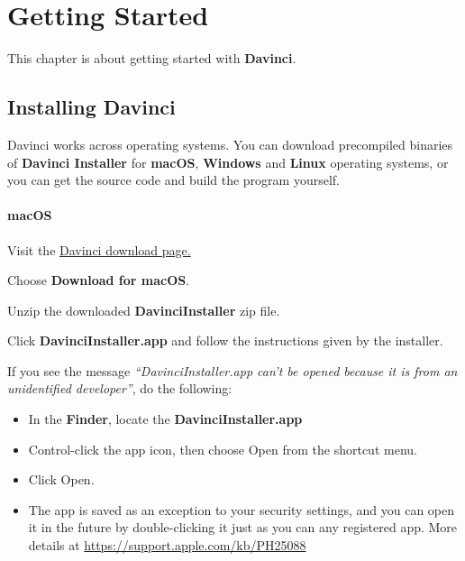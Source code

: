 

\chapter{Getting Started}

This chapter is about getting started with \textbf{Davinci}.

\section{Installing Davinci}

Davinci works across operating systems. You can download precompiled binaries of \textbf{Davinci Installer} for \textbf{macOS}, \textbf{Windows} and \textbf{Linux} operating systems, or you can get the source code and build the program yourself.

\subsubsection{macOS}

\begin{boxitemize}
	\item Visit the \href{http://davinci.sazonov.org/}{Davinci download page.}
	\item Choose \textbf{Download for macOS}.
	\item Unzip the downloaded \textbf{DavinciInstaller} zip file.
	\item Click \textbf{DavinciInstaller.app} and follow the instructions given by the installer.
	\item If you see the message \textit{``DavinciInstaller.app can't be opened because it is from an unidentified developer''}, do the following:
	\begin{itemize}
		\item In the \textbf{Finder}, locate the \textbf{DavinciInstaller.app}
		\item Control-click the app icon, then choose Open from the shortcut menu.
		\item Click Open.
		\item The app is saved as an exception to your security settings, and you can open it in the future by double-clicking it just as you can any registered app. More details at \url{https://support.apple.com/kb/PH25088}
  \end{itemize}
\end{boxitemize}

